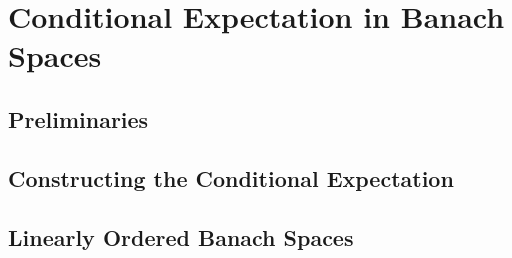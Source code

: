 
\chapter{Conditional Expectation in Banach Spaces}\label{chapter:conditional_expectation}

\section{Preliminaries}
\section{Constructing the Conditional Expectation}
\section{Linearly Ordered Banach Spaces}
